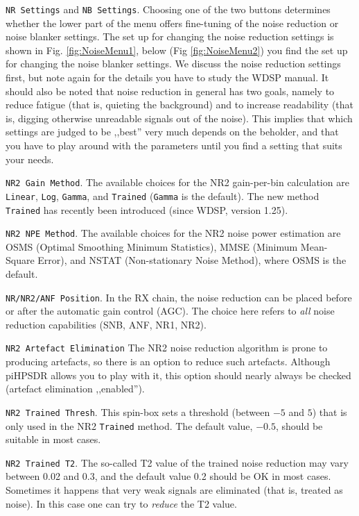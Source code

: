 \documentclass[12pt]{book}
\def\rett#1{\texttt{\color{red}#1}}
\def\pH{pi\-HPSDR\xspace}
\begin{document}
\rett{NR Settings} and \rett{NB Settings}. Choosing one of the two buttons determines whether the
lower part of the menu offers fine-tuning of the noise reduction or noise blanker settings.
The set up for changing the noise reduction settings is shown in Fig. \ref{fig:NoiseMenu1},
below (Fig \ref{fig:NoiseMenu2}) you find the set up for changing the noise blanker settings.
We discuss the noise reduction settings first, but note again for the details you have
to study the WDSP manual. It should also be noted that noise reduction in general has two
goals, namely to reduce fatigue (that is, quieting the background)
and to increase readability (that is, digging otherwise unreadable signals out of the noise).
This implies that which settings
are judged to be ,,best'' very much depends on the beholder,
and that you have to play around with the parameters until you find a setting that
suits your needs.

\rett{NR2 Gain Method}. The available choices for the NR2 gain-per-bin calculation
are \rett{Linear},
\rett{Log}, \rett{Gamma}, and \rett{Trained} (\rett{Gamma} is the default). The new method
\rett{Trained} has recently been introduced (since WDSP, version 1.25).

\rett{NR2 NPE Method}. The available choices for the NR2 noise power estimation
are OSMS
(Optimal Smoothing Minimum Statistics), MMSE (Minimum Mean-Square Error), and
NSTAT (Non-stationary Noise Method),
where OSMS is the default.

\rett{NR/NR2/ANF Position}. In the RX chain, the noise reduction can be placed before or after
the automatic gain control (AGC). The choice here refers to \textit{all} noise reduction
capabilities (SNB, ANF, NR1, NR2).

\rett{NR2 Artefact Elimination} The NR2 noise reduction algorithm is prone to producing
artefacts, so there is an option to reduce such artefacts.
Although \pH allows you to play with it, this option should nearly always be
checked (artefact elimination ,,enabled'').

\rett{NR2 Trained Thresh}. This spin-box sets a threshold (between $-5$ and $5$)
that is only used in the NR2 \rett{Trained} method. The default value, $-0.5$, should be
suitable in most cases.

\rett{NR2 Trained T2}. The so-called T2 value of the trained noise reduction may vary between
0.02 and 0.3, and the default value 0.2 should be OK in most cases. Sometimes it happens that
very weak signals are eliminated (that is, treated as noise). In this case one can try to \textit{reduce} the
T2 value.
\end{document}
